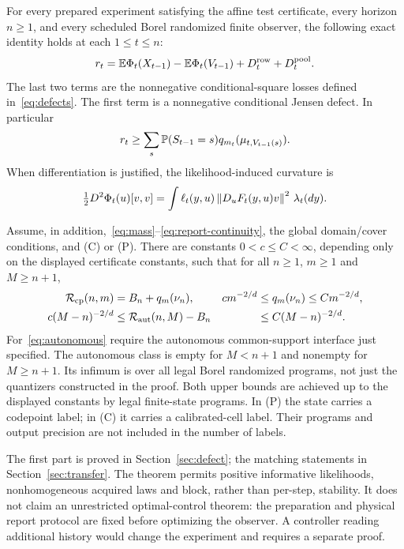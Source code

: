 \begin{theorem}\label{thm:main}
For every prepared experiment satisfying the affine test certificate, every horizon $n\ge1$, and every scheduled Borel randomized finite observer, the following exact identity holds at each $1\le t\le n$:
\begin{equation}\label{eq:main-identity}
 r_t=\mathbb E\Phi_t(X_{t-1})-\mathbb E\Phi_t(V_{t-1})
       +D_t^{\rm row}+D_t^{\rm pool}.
\end{equation}
The last two terms are the nonnegative conditional-square losses defined in~\eqref{eq:defects}. The first term is a nonnegative conditional Jensen defect. In particular
\begin{equation}\label{eq:main-converse}
 r_t\ge\sum_s\mathbb P(S_{t-1}=s)q_{m_t}(\mu_{t,V_{t-1}(s)}).
\end{equation}
When differentiation is justified, the likelihood-induced curvature is
\begin{equation}\label{eq:hessian}
 \tfrac12D^2\Phi_t(u)[v,v]
 =\int \ell_t(y,u)\left\lVert D_uF_t(y,u)v\right\rVert^2\,\lambda_t(dy).
\end{equation}

Assume, in addition,~\eqref{eq:mass}--\eqref{eq:report-continuity}, the global domain/cover conditions, and (C) or (P). There are constants $0<c\le C<\infty$, depending only on the displayed certificate constants, such that for all $n\ge1$, $m\ge1$ and $M\ge n+1$,
\begin{align}
 \mathcal R_{\rm cp}(n,m)&=B_n+q_m(\nu_n),
 &c m^{-2/d}&\le q_m(\nu_n)\le C m^{-2/d},\label{eq:checkpoint}\\
 c(M-n)^{-2/d}&\le\mathcal R_{\rm aut}(n,M)-B_n
 & &\le C(M-n)^{-2/d}.
 \label{eq:autonomous}
\end{align}
For~\eqref{eq:autonomous} require the autonomous common-support interface just specified. The autonomous class is empty for $M<n+1$ and nonempty for $M\ge n+1$. Its infimum is over all legal Borel randomized programs, not just the quantizers constructed in the proof. Both upper bounds are achieved up to the displayed constants by legal finite-state programs. In (P) the state carries a codepoint label; in (C) it carries a calibrated-cell label. Their programs and output precision are not included in the number of labels.
\end{theorem}
The first part is proved in Section~\ref{sec:defect}; the matching statements in Section~\ref{sec:transfer}. The theorem permits positive informative likelihoods, nonhomogeneous acquired laws and block, rather than per-step, stability. It does not claim an unrestricted optimal-control theorem: the preparation and physical report protocol are fixed before optimizing the observer. A controller reading additional history would change the experiment and requires a separate proof.
